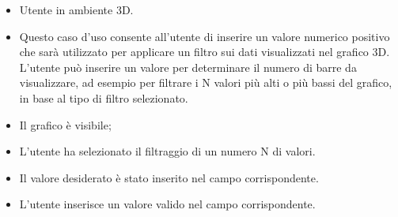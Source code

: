 \UCdsc
{ %
    \begin{itemize}
        \item Utente in ambiente 3D.
    \end{itemize}
}
{ %
    \begin{itemize}
        \item Questo caso d'uso consente all'utente di inserire un valore numerico positivo che sarà utilizzato per applicare un filtro sui dati visualizzati nel grafico 3D. L'utente può inserire un valore per determinare il numero di barre da visualizzare, ad esempio per filtrare i N valori più alti o più bassi del grafico, in base al tipo di filtro selezionato.
    \end{itemize}
}
{ %
    \begin{itemize}
        \item Il grafico è visibile;
        \item L'utente ha selezionato il filtraggio di un numero N di valori.
    \end{itemize}
}
{ %
    \begin{itemize}
        \item Il valore desiderato è stato inserito nel campo corrispondente.
    \end{itemize}
}
{ %
    \begin{itemize}
        \item L'utente inserisce un valore valido nel campo corrispondente.
    \end{itemize}
}



